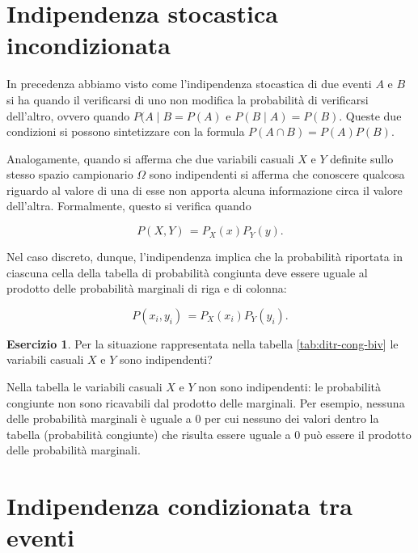 \documentclass[
  11pt,
]{krantz}
\theoremstyle{definition}
\theoremstyle{definition}
\theoremstyle{definition}
\newtheorem{exercise}{Esercizio}[chapter]
\theoremstyle{definition}
\theoremstyle{remark}
\begin{document}
\hypertarget{indipendenza-stocastica-incondizionata}{%
\section{Indipendenza stocastica incondizionata}\label{indipendenza-stocastica-incondizionata}}

In precedenza abbiamo visto come l'indipendenza stocastica di due eventi \(A\) e \(B\) si ha quando il verificarsi di uno non modifica la probabilità di verificarsi dell'altro, ovvero quando \(P(A \mid B = P(A)\) e \(P(B \mid A) = P(B)\). Queste due condizioni si possono sintetizzare con la formula \(P(A \cap B) = P(A) P(B)\).

Analogamente, quando si afferma che due variabili casuali \(X\) e \(Y\) definite sullo stesso spazio campionario \(\Omega\) sono indipendenti si afferma che conoscere qualcosa riguardo al valore di una di esse non apporta alcuna informazione circa il valore dell'altra. Formalmente, questo si verifica quando

\begin{equation}
P(X, Y)\, = P_X(x)P_Y(y).
\end{equation}

Nel caso discreto, dunque, l'indipendenza implica che la probabilità riportata in ciascuna cella della tabella di probabilità congiunta deve essere uguale al prodotto delle probabilità marginali di riga e di colonna:

\[
P(x_i, y_i)\, = P_X(x_i) P_Y(y_i).
\]

\begin{exercise}
Per la situazione rappresentata nella tabella \ref{tab:ditr-cong-biv} le variabili casuali \(X\) e \(Y\) sono indipendenti?

Nella tabella le variabili casuali \(X\) e \(Y\) non sono indipendenti: le probabilità congiunte non sono ricavabili dal prodotto delle marginali. Per esempio, nessuna delle probabilità marginali è uguale a \(0\) per cui nessuno dei valori dentro la tabella (probabilità congiunte) che risulta essere uguale a \(0\) può essere il prodotto delle probabilità marginali.
\end{exercise}

\hypertarget{indipendenza-condizionata-tra-eventi}{%
\section{Indipendenza condizionata tra eventi}\label{indipendenza-condizionata-tra-eventi}}
\end{document}
